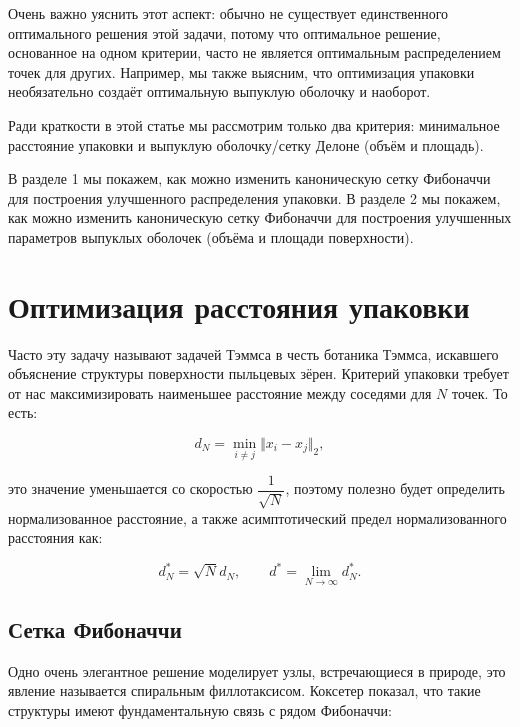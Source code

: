 \documentclass[12pt, a4paper]{article}
\begin{document}
Очень важно уяснить этот аспект: обычно не существует единственного оптимального решения этой задачи, потому что оптимальное решение, основанное на одном критерии, часто не является оптимальным распределением точек для других. Например, мы также выясним, что оптимизация упаковки необязательно создаёт оптимальную выпуклую оболочку и наоборот.

Ради краткости в этой статье мы рассмотрим только два критерия: минимальное расстояние упаковки и выпуклую оболочку/сетку Делоне (объём и площадь).

В разделе 1 мы покажем, как можно изменить каноническую сетку Фибоначчи для построения улучшенного распределения упаковки. В разделе 2 мы покажем, как можно изменить каноническую сетку Фибоначчи для построения улучшенных параметров выпуклых оболочек (объёма и площади поверхности).

\newpage

\section{Оптимизация расстояния упаковки}

Часто эту задачу называют задачей Тэммса в честь ботаника Тэммса, искавшего объяснение структуры поверхности пыльцевых зёрен. Критерий упаковки требует от нас максимизировать наименьшее расстояние между соседями для $N$ точек. То есть:

\begin{displaymath}
	d_N = \min_{i \neq j} \Vert x_i - x_j \Vert _2,
\end{displaymath}

\noindent это значение уменьшается со скоростью $\dfrac{1}{\sqrt{N}}$, поэтому полезно будет определить нормализованное расстояние, а также асимптотический предел нормализованного расстояния как:

\begin{displaymath}
	d^*_N = \sqrt{N} d_N,
	\qquad
	d^* = \lim_{N \rightarrow \infty} d^*_N.
\end{displaymath}

\subsection{Сетка Фибоначчи}

Одно очень элегантное решение моделирует узлы, встречающиеся в природе, это явление называется спиральным филлотаксисом. Коксетер показал, что такие структуры имеют фундаментальную связь с рядом Фибоначчи:
\end{document}

